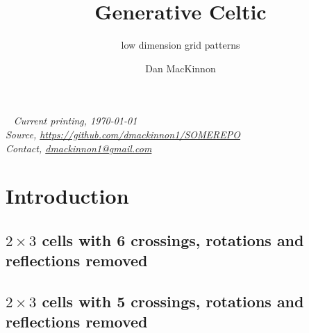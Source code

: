 \documentclass{tufte-book}
\title{Generative Celtic}
\subtitle{low dimension grid patterns}
\author[]{Dan MacKinnon}
\begin{document}
\maketitle


\newpage
\begin{fullwidth}
~\vfill
\thispagestyle{empty}
\setlength{\parindent}{0pt}
\textit{Current printing, \today}\\
\textit{Source, \url{https://github.com/dmackinnon1/SOMEREPO}}\\
\textit{Contact, \href{mailto://dmackinnon1@gmail.com}{dmackinnon1@gmail.com}}
\end{fullwidth}

\cleardoublepage

\chapter*{Introduction}

\newpage





\newpage
\section{$2\times 3$ cells with 6 crossings, rotations and reflections removed}

%

\newpage
\section{$2\times 3$ cells with 5 crossings, rotations and reflections removed}

%


\end{document}
